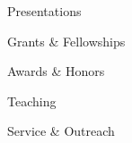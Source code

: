 \documentclass{cv} %
\begin{document}




\begin{rSection}{Presentations}
\end{rSection}

\begin{rSection}{Grants \& Fellowships}
\end{rSection}

\begin{rSection}{Awards \& Honors}
\end{rSection}

\begin{rSection}{Teaching}
\end{rSection}

\begin{rSection}{Service \& Outreach}
\end{rSection}
\end{document}
